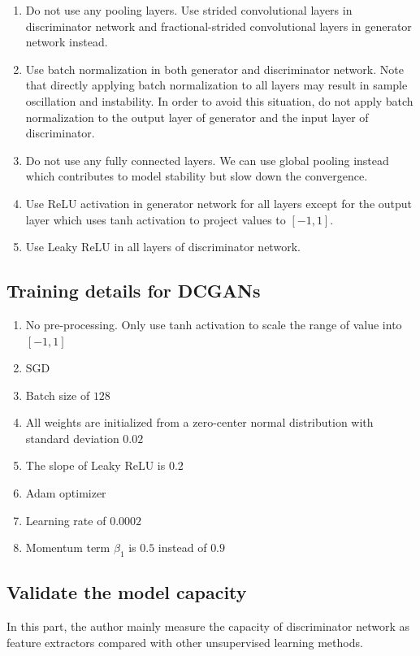 \documentclass{article} %
\begin{document}
\begin{enumerate}
    \item Do not use any pooling layers. Use strided convolutional layers in discriminator network and fractional-strided convolutional layers in generator network instead.
    \item Use batch normalization in both generator and discriminator network. Note that directly applying batch normalization to all layers may result in sample oscillation and instability. In order to avoid this situation, do not apply batch normalization to the output layer of generator and the input layer of discriminator.
    \item Do not use any fully connected layers. We can use global pooling instead which contributes to model stability but slow down the convergence.
    \item Use ReLU activation in generator network for all layers except for the output layer which uses tanh activation to project values to $[-1, 1]$.
    \item Use Leaky ReLU in all layers of discriminator network.
\end{enumerate}

\subsection{Training details for DCGANs}

\begin{enumerate}
    \item No pre-processing. Only use tanh activation to scale the range of value into $[-1,1]$
    \item SGD
    \item Batch size of $128$
    \item All weights are initialized from a zero-center normal distribution with standard deviation $0.02$
    \item The slope of Leaky ReLU is $0.2$
    \item Adam optimizer
    \item Learning rate of $0.0002$
    \item Momentum term $\beta_1$ is $0.5$ instead of $0.9$
\end{enumerate}

\subsection{Validate the model capacity}

In this part, the author mainly measure the capacity of discriminator network as feature extractors compared with other unsupervised learning methods.
\end{document}
